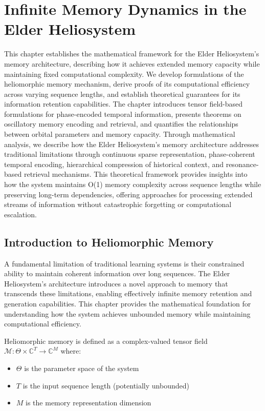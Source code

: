 \chapter{Infinite Memory Dynamics in the Elder Heliosystem}

\begin{tcolorbox}[colback=blue!5!white,colframe=blue!75!black,title=Chapter Summary]
This chapter establishes the mathematical framework for the Elder Heliosystem's memory architecture, describing how it achieves extended memory capacity while maintaining fixed computational complexity. We develop formulations of the heliomorphic memory mechanism, derive proofs of its computational efficiency across varying sequence lengths, and establish theoretical guarantees for its information retention capabilities. The chapter introduces tensor field-based formulations for phase-encoded temporal information, presents theorems on oscillatory memory encoding and retrieval, and quantifies the relationships between orbital parameters and memory capacity. Through mathematical analysis, we describe how the Elder Heliosystem's memory architecture addresses traditional limitations through continuous sparse representation, phase-coherent temporal encoding, hierarchical compression of historical context, and resonance-based retrieval mechanisms. This theoretical framework provides insights into how the system maintains O(1) memory complexity across sequence lengths while preserving long-term dependencies, offering approaches for processing extended streams of information without catastrophic forgetting or computational escalation.
\end{tcolorbox}

\section{Introduction to Heliomorphic Memory}

A fundamental limitation of traditional learning systems is their constrained ability to maintain coherent information over long sequences. The Elder Heliosystem's architecture introduces a novel approach to memory that transcends these limitations, enabling effectively infinite memory retention and generation capabilities. This chapter provides the mathematical foundation for understanding how the system achieves unbounded memory while maintaining computational efficiency.

\begin{definition}
Heliomorphic memory is defined as a complex-valued tensor field $\mathcal{M}: \Theta \times \mathbb{C}^T \rightarrow \mathbb{C}^M$ where:
\begin{itemize}
    \item $\Theta$ is the parameter space of the system
    \item $T$ is the input sequence length (potentially unbounded)
    \item $M$ is the memory representation dimension
\end{itemize}
\end{definition}

